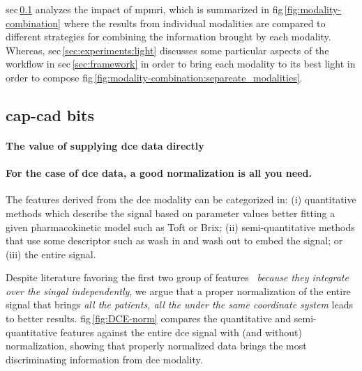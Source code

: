 \documentclass[num-refs]{wiley-article}
\begin{document}
\Acl{sec}\,\ref{sec:experiments:mpmri-comparison} analyzes the impact of \ac{mpmri}, which
is summarized in \Ac{fig}\,\ref{fig:modality-combination} where the results from
individual modalities are compared to different strategies for combining the
information brought by each modality.
Whereas, \ac{sec}\,\ref{sec:experiments:light} discusses some particular aspects
of the workflow in \Ac{sec}\,\ref{sec:framework} in order to bring each
modality to its best light in order to compose \Ac{fig}\,\ref{fig:modality-combination:separeate_modalities}.

\subsection{\ac{cap}-\ac{cad} bits}
\label{sec:experiments:mpmri-comparison}
\paragraph{The value of supplying \ac{dce} data directly}
\paragraph{For the case of \ac{dce} data, a good normalization is all you need.}

The features derived from the \ac{dce} modality can be categorized in: 
(i) quantitative methods which describe the signal based on parameter values
better fitting a given pharmacokinetic model such as Toft or Brix;
(ii) semi-quantitative methods that use some descriptor such as wash in and wash
out to embed the signal;
or (iii) the entire signal.

Despite literature favoring the first two group of
features~\cite{lemaitre2015computer} \emph{because they integrate over the
  singal independently}, we argue that a proper normalization of
the entire signal that brings \emph{all the patients, all the under the same
  coordinate system} leads to better results. 
%
\Acl{fig}\,\ref{fig:DCE-norm} compares the quantitative and semi-quantitative
features against the entire \ac{dce} signal with (and without) normalization,
showing that properly normalized data brings the most discriminating information
from \ac{dce} modality.

\end{document}
